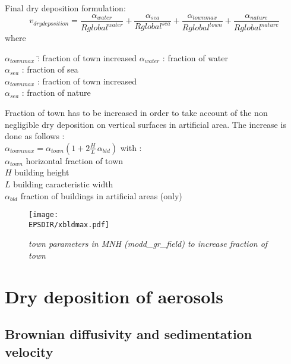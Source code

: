 Final dry deposition formulation:
$$
v_{dry deposition} = \frac{\alpha_{water}}{Rglobal^{water}} +
\frac{\alpha_{sea}}{Rglobal^{sea}} +
\frac{\alpha_{townmax}}{Rglobal^{town}} +
\frac{\alpha_{nature}}{Rglobal^{nature}}
$$
where\\ 
\begin{tabbing}
$\alpha_{townmax}$ \=: fraction of town increased \kill
$\alpha_{water}$ \> : fraction of water \\
$\alpha_{sea}$ \> : fraction of sea \\
$\alpha_{townmax}$ \> : fraction of town increased \\
$\alpha_{sea}$ \> : fraction of nature 
\end{tabbing}
Fraction of town has to be increased in order to take account of the non
negligible dry deposition on vertical surfaces in artificial
area. The increase is done as follows :\\
$\alpha_{townmax} = \alpha_{town} (1+2 \frac{H}{L} \, \alpha_{bld})$
with : \\
$\alpha_{town}$ horizontal fraction of town \\
$H$ building height \\
$L$ building caracteristic width \\
$\alpha_{bld}$ fraction of buildings in artificial areas (only)
\begin{figure}[hbp]
\begin{center}
\texttt{[image: \\EPSDIR/xbldmax.pdf]}
\end{center}
\label{bld}
\caption{\sl{town parameters in MNH (modd\_gr\_field) to increase
fraction of town}} 
\end{figure}

\section{Dry deposition of aerosols}
\subsection*{Brownian diffusivity and sedimentation velocity}

